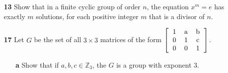 \documentclass[paper=usletter, fontsize=12pt]{article}
\begin{document}
\begin{itemize}
\begin{itemize}
            \item[\textbf{13}] Show that in a finite cyclic group of order $n$,
            the equation $x^m=e$ has exactly $m$ solutions, for each positive
            integer $m$ that is a divisor of $n$.
            \begin{cproof}
            \end{cproof}

            \item[\textbf{17}] Let $G$ be the set of all $3\times 3$ matrices
            of the form $\left[\begin{tabular}{ccc}
                    1 & a & b \\
                    0 & 1 & c \\
                    0 & 0 & 1
                \end{tabular}\right]$.

            \begin{itemize}

                \item[\textbf{a}] Show that if $a,b,c\in \mathbb{Z}_3$, the $G$
                is a group with exponent 3.
                \begin{cproof}


\end{cproof}
\end{itemize}
\end{itemize}
\end{itemize}
\end{document}

